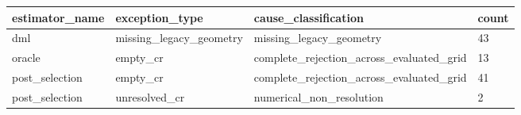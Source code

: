 \begin{tabular}{llll}
\hline
estimator\_name & exception\_type & cause\_classification & count \\
\hline
dml & missing\_legacy\_geometry & missing\_legacy\_geometry & 43 \\
oracle & empty\_cr & complete\_rejection\_across\_evaluated\_grid & 13 \\
post\_selection & empty\_cr & complete\_rejection\_across\_evaluated\_grid & 41 \\
post\_selection & unresolved\_cr & numerical\_non\_resolution & 2 \\
\hline
\end{tabular}
